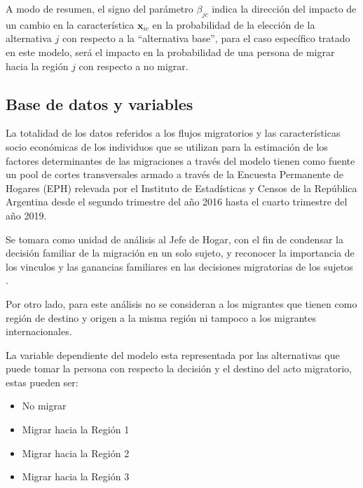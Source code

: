 \documentclass[12pt,a4paper]{article}
\begin{document}
A modo de resumen, el signo del parámetro $\beta_{jc}$ indica la dirección del impacto de un cambio en la característica $\textbf{x}_{ic}$ en la probabilidad de la elección de la alternativa $j$ con respecto a la ``alternativa base'', para el caso específico tratado en este modelo, será el impacto en la probabilidad de una persona de migrar hacia la región $j$ con respecto a no migrar.

\subsection{Base de datos y variables}
La totalidad de los datos referidos a los flujos migratorios y las características socio económicas de los individuos que se utilizan para la estimación de los factores determinantes de las migraciones a través del modelo tienen como fuente un pool de cortes transversales  armado a través de la Encuesta Permanente de Hogares (EPH) relevada por el Instituto de Estadísticas y Censos de la República Argentina desde el segundo trimestre del año 2016 hasta el cuarto trimestre del año 2019.

Se tomara como unidad de análisis al Jefe de Hogar, con el fin de condensar la decisión familiar de la migración en un solo sujeto, y reconocer la importancia de los vinculos y las ganancias familiares en las decisiones migratorias de los sujetos \parencite{mincer_family_1978}.

Por otro lado, para este análisis no se consideran a los migrantes que tienen como región de destino y origen a la misma región ni tampoco a los migrantes internacionales.

La variable dependiente del modelo esta representada por las alternativas que puede tomar la persona con respecto la decisión y el destino del acto migratorio, estas pueden ser:
\begin{itemize}
\item No migrar
\item Migrar hacia la Región 1
\item Migrar hacia la Región 2
\item Migrar hacia la Región 3
\end{itemize}
\end{document}

